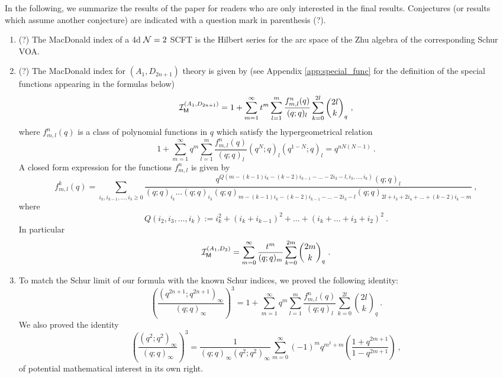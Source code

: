 \documentclass[a4paper,10pt]{article}
\newcommand{\mr}[1]{\mathsf{#1}}
\newcommand{\tsf}[1]{\textsf{#1}}
\def\CI {{\cal I}}
\def\CN {{\cal N}}
\def\CI {{{\cal I}}}
\begin{document}
In the following, we summarize the results of the paper for readers who are only interested in the final results. Conjectures (or results which assume another conjecture) are indicated with a question mark in parenthesis (?).
\begin{enumerate}
    \item (?) The MacDonald index of a 4d $\CN=2$ \tsf{SCFT} is the Hilbert series for the arc space of the Zhu algebra of the corresponding Schur \tsf{VOA}. 
    \item (?) The MacDonald index for $(A_1,D_{2n+1})$ theory is given by (see Appendix \ref{app:special_func} for the definition of the special functions appearing in the formulas below) 
    \begin{equation}
    \CI^{(A_1,D_{2n+1})}_{\mr{M}} = 1 + \sum_{m=1}^\infty 
    t^m \sum_{l=1}^m
    \frac{f^n_{m,l}(q)}{(q;q)_l}\sum_{k=0}^{2l}\binom{2l}{k}_q~,
\end{equation}
where $f^n_{m,l}(q)$ is a class of polynomial functions in $q$ which satisfy the hypergeometrical relation 
\begin{equation}
    1 + \sum_{m=1}^\infty q^m \sum_{l=1}^m 
    \frac{f^n_{m,l}(q)}{(q;q)_l} (q^N; q)_l 
    (q^{1-N};q)_l = q^{nN(N-1)}~.
\end{equation}
A closed form expression for the functions $f^n_{m,l}$ is given by 
\begin{equation}
f^k_{m,l}(q)=\sum_{i_k,i_{k-1},\dots,i_3\geq 0}\frac{q^{Q(m-(k-1)i_k-(k-2)i_{k-1}-\dots-2i_3-l,i_3,\dots,i_k)}(q;q)_{l}}{(q;q)_{i_k}\dots (q;q)_{i_3}(q;q)_{m-(k-1)i_k-(k-2)i_{k-1}-\dots-2i_3-l}(q;q)_{2l+i_3+2i_4+\dots+(k-2)i_k-m}}~,    
\end{equation}
where 
\begin{equation}
    Q(i_2,i_3,\dots,i_k):=i_k^2+(i_k+i_{k-1})^2+\dots+(i_k+\dots+i_3+i_2)^2~.
\end{equation}
In particular
\begin{equation}
    \CI_{\mr{M}}^{(A_1,D_3)}=\sum_{m=0}^\infty 
    \frac{t^m}{(q;q)_m} \sum_{k=0}^{2m}\binom{2m}{k}_q~.
\end{equation}
\item To match the Schur limit of our formula with the known Schur indices, we proved the following identity:
\begin{equation}
\left(\frac{\left(q^{2n+1} ; q^{2n+1}\right)_{\infty}}{(q ; q)_{\infty}}\right)^3= 1 + \sum_{m=1}^\infty 
    q^m \sum_{l=1}^m
    \frac{f^n_{m,l}(q)}{(q;q)_l}\sum_{k=0}^{2l}\binom{2l}{k}_q~.    
\end{equation}
We also proved the identity
\begin{equation}
\left(\frac{\left(q^{2} ; q^{2}\right)_{\infty}}{(q ; q)_{\infty}}\right)^3= \frac{1}{(q;q)_\infty(q^2;q^2)_\infty}\sum_{m=0}^\infty(-1)^mq^{m^2+m}\left(\frac{1+q^{2m+1}}{1-q^{2m+1}}\right)~,    
\end{equation}
of potential mathematical interest in its own right. 
\end{enumerate}
\end{document}
